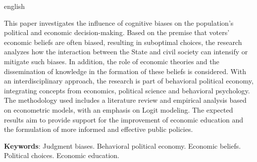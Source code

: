 
\begin{resumo}[Abstract]
 \begin{otherlanguage*}{english}

  This paper investigates the influence of cognitive biases on the population's political and economic decision-making. Based on the premise that voters' economic beliefs are often biased, resulting in suboptimal choices, the research analyzes how the interaction between the State and civil society can intensify or mitigate such biases. In addition, the role of economic theories and the dissemination of knowledge in the formation of these beliefs is considered. With an interdisciplinary approach, the research is part of behavioral political economy, integrating concepts from economics, political science and behavioral psychology. The methodology used includes a literature review and empirical analysis based on econometric models, with an emphasis on Logit modeling. The expected results aim to provide support for the improvement of economic education and the formulation of more informed and effective public policies.

   \textbf{Keywords}: Judgment biases. Behavioral political economy. Economic beliefs. Political choices. Economic education.
 \end{otherlanguage*}
\end{resumo}
